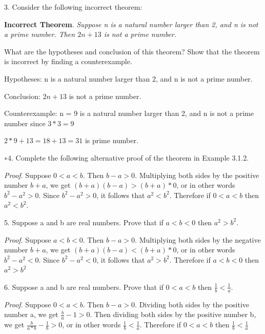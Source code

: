 \documentclass{article}
\begin{document}
3. Consider the following incorrect theorem:

\textbf{Incorrect Theorem}. \textit{Suppose n is a natural number larger than 2, and
n is not a prime number. Then $2n + 13$ is not a prime number.}

What are the hypotheses and conclusion of this theorem? Show that
the theorem is incorrect by finding a counterexample.

\vspace{30pt}

Hypotheses: n is a natural number larger than 2, and n is not a prime number.

Conclusion: $2n + 13$ is not a prime number.

Counterexample: n = 9 is a natural number larger than 2, and n is not a prime number since $3*3=9$

$2 * 9 + 13 = 18 + 13 = 31$ is prime number.

\vspace{30pt}

∗4. Complete the following alternative proof of the theorem in Example 3.1.2.

\textit{Proof}. Suppose $0 < a < b$. Then $b - a > 0$.
Multiplying both sides by the positive number $b + a$, we get $(b+a)(b-a)>(b+a)*0$, or in other words $b^2 - a^2 > 0$.
Since $b^2 - a^2 > 0$, it follows that $a^2 < b^2$. Therefore if $0 < a < b$ then
$a^2 < b^2$.

\vspace{20pt}

5. Suppose a and b are real numbers. Prove that if $a < b < 0$ then $a^2 > b^2$.

\vspace{20pt}

\textit{Proof}. Suppose $a < b < 0$. Then $b - a > 0$.
Multiplying both sides by the negative number $b + a$, we get $(b+a)(b-a)<(b+a)*0$, or in other words $b^2 - a^2 < 0$.
Since $b^2 - a^2 < 0$, it follows that $a^2 > b^2$. Therefore if $a < b < 0$ then $a^2 > b^2$

\vspace{30pt}

6. Suppose a and b are real numbers. Prove that if $0 < a < b$ then $\frac{1}{b} < \frac{1}{a}$.

\vspace{20pt}

\textit{Proof}. Suppose $0 < a < b$. Then $b - a > 0$.
Dividing both sides by the positive number a, we get $\frac{b}{a} - 1 > 0$.
Then dividing both sides by the positive number b, we get $\frac{b}{a*b} - \frac{1}{b} > 0$, or in other words
$\frac{1}{b} < \frac{1}{a}$. Therefore if $0 < a < b$ then $\frac{1}{b} < \frac{1}{a}$
\end{document}
